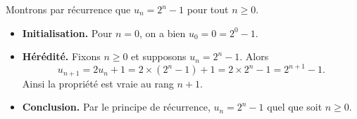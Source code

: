 \documentclass[11pt,class=report,crop=false]{standalone}
\begin{document}
\begin{enumerate}
    Montrons par récurrence que $u_n = 2^n - 1$ pour tout $n\ge0$.
    \begin{itemize}
        \item \textbf{Initialisation.} Pour $n=0$, on a bien  $u_0=0=2^0-1$.
        
        \item \textbf{Hérédité.}
        Fixons $n\ge0$ et supposons $u_n = 2^n-1$.
        Alors 
        $$u_{n+1} = 2u_n+1 = 2 \times (2^n-1) + 1 = 2 \times 2^n - 1 = 2^{n+1}-1.$$
        Ainsi la propriété est vraie au rang $n+1$.
        
        \item \textbf{Conclusion.} Par le principe de récurrence, $u_n = 2^n - 1$ quel que soit $n \ge 0$.
    \end{itemize}
    


\end{enumerate}
\fincorrection
\finexercice
\end{document}
